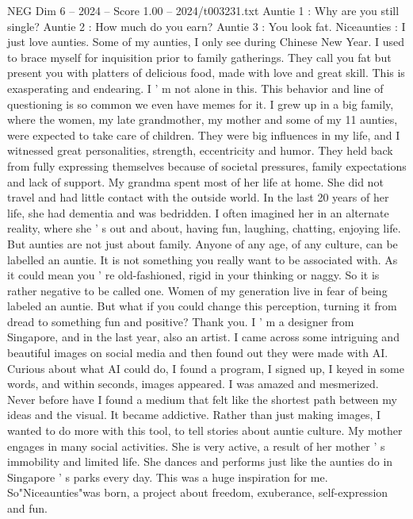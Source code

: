 \begin{textsample}{NEG Dim 6 – 2024 – Score 1.00 – 2024/t003231.txt}  \label{ex:f6_neg_006}
Auntie 1 : Why are you still single?
Auntie 2 : How much do you earn?
Auntie 3 : You look fat.
Niceaunties : I just love aunties.
Some of my aunties, I only see during Chinese New Year.
I used to brace myself for inquisition prior to family gatherings.
They call you fat but present you with platters of delicious food, made with love and great skill.
This is exasperating and endearing.
I ' m not alone in this.
This behavior and line of questioning is so common we even have memes for it.
I grew up in a big family, where the women, my late grandmother, my mother and some of my 11 aunties, were expected to take care of children.
They were big influences in my life, and I witnessed great personalities, strength, eccentricity and humor.
They held back from fully expressing themselves because of societal pressures, family expectations and lack of support.
My grandma spent most of her life at home.
She did not travel and had little contact with the outside world.
In the last 20 years of her life, she had dementia and was bedridden.
I often imagined her in an alternate reality, where she ' s out and about, having fun, laughing, chatting, enjoying life.
But aunties are not just about family.
Anyone of any age, of any culture, can be labelled an auntie.
It is not something you really want to be associated with.
As it could mean you ' re old-fashioned, rigid in your thinking or naggy.
So it is rather negative to be called one.
Women of my generation live in fear of being labeled an auntie.
But what if you could change this perception, turning it from dread to something fun and positive?
Thank you.
I ' m a designer from Singapore, and in the last year, also an artist.
I came across some intriguing and beautiful images on social media and then found out they were made with AI.
Curious about what AI could do, I found a program, I signed up, I keyed in some words, and within seconds, images appeared.
I was amazed and mesmerized.
Never before have I found a medium that felt like the shortest path between my ideas and the visual.
It became addictive.
Rather than just making images, I wanted to do more with this tool, to tell stories about auntie culture.
My mother engages in many social activities.
She is very active, a result of her mother ' s immobility and limited life.
She dances and performs just like the aunties do in Singapore ' s parks every day.
This was a huge inspiration for me.
So"Niceaunties"was born, a project about freedom, exuberance, self-expression and fun.

\end{textsample}
